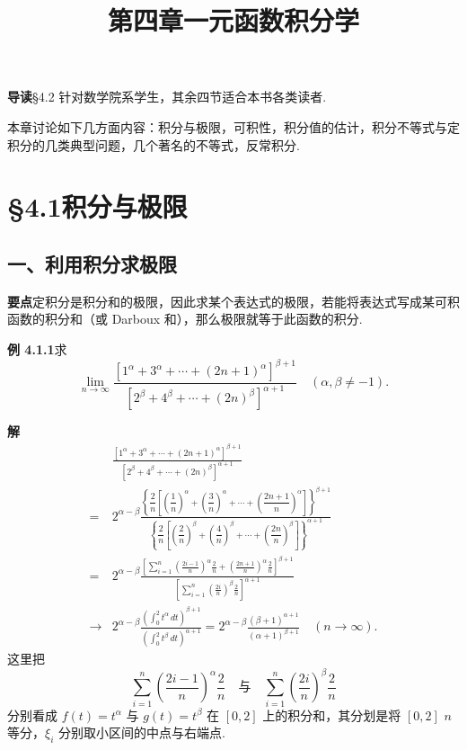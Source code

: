 \documentclass[UTF8, 12pt, fontset=fandol, oneside]{ctexart}
\title{第四章\quad 一元函数积分学}
\author{}
\date{}
\begin{document}
\maketitle

\noindent\textbf{导读}\quad §4.2 针对数学院系学生，其余四节适合本书各类读者.

本章讨论如下几方面内容：积分与极限，可积性，积分值的估计，积分不等式与定积分的几类典型问题，几个著名的不等式，反常积分.

\section*{§4.1\quad 积分与极限}

\subsection*{一、利用积分求极限}

\noindent\textbf{要点}\quad 定积分是积分和的极限，因此求某个表达式的极限，若能将表达式写成某可积函数的积分和（或 Darboux 和），那么极限就等于此函数的积分.

\noindent\textbf{例 4.1.1}\quad 求
\[
\lim_{n\to\infty}
\frac{\left[1^\alpha+3^\alpha+\cdots+(2n+1)^\alpha\right]^{\beta+1}}
{\left[2^\beta+4^\beta+\cdots+(2n)^\beta\right]^{\alpha+1}}
\quad(\alpha,\beta\ne-1).
\]

\noindent\textbf{解}\quad
\[
\begin{aligned}
&\frac{\left[1^\alpha+3^\alpha+\cdots+(2n+1)^\alpha\right]^{\beta+1}}
{\left[2^\beta+4^\beta+\cdots+(2n)^\beta\right]^{\alpha+1}}\\
={}&2^{\alpha-\beta}
\frac{\left\{\dfrac2n\left[\left(\dfrac1n\right)^\alpha+
\left(\dfrac3n\right)^\alpha+\cdots+
\left(\dfrac{2n+1}{n}\right)^\alpha\right]\right\}^{\beta+1}}
{\left\{\dfrac2n\left[\left(\dfrac2n\right)^\beta+
\left(\dfrac4n\right)^\beta+\cdots+
\left(\dfrac{2n}{n}\right)^\beta\right]\right\}^{\alpha+1}}\\
={}&2^{\alpha-\beta}
\frac{\left[\displaystyle\sum_{i=1}^n
\left(\frac{2i-1}{n}\right)^\alpha\frac2n+
\left(\frac{2n+1}{n}\right)^\alpha\frac2n\right]^{\beta+1}}
{\left[\displaystyle\sum_{i=1}^n
\left(\frac{2i}{n}\right)^\beta\frac2n\right]^{\alpha+1}}\\
\longrightarrow{}&2^{\alpha-\beta}
\frac{\left(\displaystyle\int_0^2 t^\alpha\,dt\right)^{\beta+1}}
{\left(\displaystyle\int_0^2 t^\beta\,dt\right)^{\alpha+1}}
=2^{\alpha-\beta}\frac{(\beta+1)^{\alpha+1}}{(\alpha+1)^{\beta+1}}
\quad(n\to\infty).
\end{aligned}
\]
这里把
\[
\sum_{i=1}^n\left(\frac{2i-1}{n}\right)^\alpha\frac2n
\quad\text{与}\quad
\sum_{i=1}^n\left(\frac{2i}{n}\right)^\beta\frac2n
\]
分别看成 $f(t)=t^\alpha$ 与 $g(t)=t^\beta$ 在 $[0,2]$ 上的积分和，其分划是将 $[0,2]$ $n$ 等分，$\xi_i$ 分别取小区间的中点与右端点.
\end{document}
